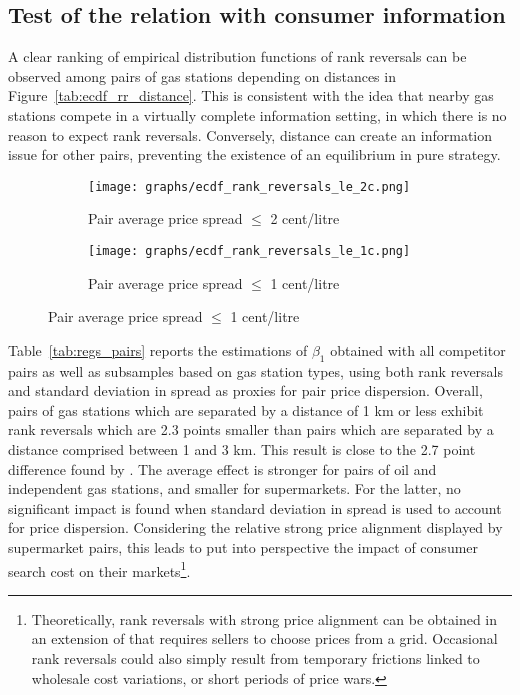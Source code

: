 \documentclass[english]{article}
\begin{document}
\subsection{Test of the relation with consumer information}

A clear ranking of empirical distribution functions of rank reversals can be observed among pairs of gas stations depending on distances in Figure~\ref{tab:ecdf_rr_distance}. This is consistent with the idea that nearby gas stations compete in a virtually complete information setting, in which there is no reason to expect rank reversals. Conversely, distance can create an information issue for other pairs, preventing the existence of an equilibrium in pure strategy.

\begin{figure}[H]
\centering
\caption{Empirical distribution functions of rank reversals}
\label{tab:ecdf_rr_distance}
\begin{subfigure}{.49\textwidth}
\centering
\texttt{[image: graphs/ecdf\_rank\_reversals\_le\_2c.png]}
\caption[short]{Pair average price spread $\le$ 2 cent/litre}
\end{subfigure}
\begin{subfigure}{.49\textwidth}
\centering
\texttt{[image: graphs/ecdf\_rank\_reversals\_le\_1c.png]}
\caption[short]{Pair average price spread $\le$ 1 cent/litre}
\end{subfigure}
\end{figure}

Table~\ref{tab:regs_pairs} reports the estimations of $\beta_1$ obtained with all competitor pairs as well as subsamples based on gas station types, using both rank reversals and standard deviation in spread as proxies for pair price dispersion. Overall, pairs of gas stations which are separated by a distance of 1 km or less exhibit rank reversals which are 2.3 points smaller than pairs which are separated by a distance comprised between 1 and 3 km. This result is close to the 2.7 point difference found by \cite{CHA11}. The average effect is stronger for pairs of oil and independent gas stations, and smaller for supermarkets. For the latter, no significant impact is found when standard deviation in spread is used to account for price dispersion. Considering the relative strong price alignment displayed by supermarket pairs, this leads to put into perspective the impact of consumer search cost on their markets\footnote{Theoretically, rank reversals with strong price alignment can be obtained in an extension of \cite{VAR80} that requires sellers to choose prices from a grid. Occasional rank reversals could also simply result from temporary frictions linked to wholesale cost variations, or short periods of price wars.}. 
\end{document}
